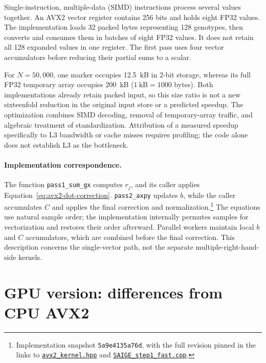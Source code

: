\documentclass{article}
\begin{document}
Single-instruction, multiple-data (SIMD) instructions process several
values together. An AVX2 vector register contains 256 bits and holds
eight FP32 values.
The implementation loads 32 packed bytes representing 128 genotypes,
then converts and consumes them in batches of eight FP32 values.
It does not retain all 128 expanded values in one register.
The first pass uses four vector accumulators before reducing their
partial sums to a scalar.

For $N=50{,}000$, one marker occupies 12.5~kB in 2-bit storage,
whereas its full FP32 temporary array occupies 200~kB
($1~\mathrm{kB}=1000$ bytes). Both implementations already retain
packed input, so this size ratio is not a new sixteenfold reduction
in the original input store or a predicted speedup.
The optimization combines SIMD decoding, removal of temporary-array
traffic, and algebraic treatment of standardization.
Attribution of a measured speedup specifically to L3 bandwidth or
cache misses requires profiling; the code alone does not establish
L3 as the bottleneck.

\paragraph{Implementation correspondence.}
The function \texttt{pass1\_sum\_gx} computes $r_j$,
and its caller applies Equation~\eqref{eq:avx2-dot-correction}.
\texttt{pass2\_axpy} updates $b$, while the caller accumulates $C$ and
applies the final correction and normalization.\footnote{Implementation
snapshot \texttt{5a9e4135a76d}, with the full revision pinned in the links to
\href{https://github.com/FrancisFengLu/SAIGE-cpp-comparison/blob/5a9e4135a76dab73d73274e930f27524c9712958/SAIGE_cpp_260716/step1_saige-null/tools/avx2_kernel/avx2_kernel.hpp}{\texttt{avx2\_kernel.hpp}}
and
\href{https://github.com/FrancisFengLu/SAIGE-cpp-comparison/blob/5a9e4135a76dab73d73274e930f27524c9712958/SAIGE_cpp_260716/step1_saige-null/SAIGE_step1_fast.cpp}{\texttt{SAIGE\_step1\_fast.cpp}}.}
The equations use natural sample order; the implementation internally
permutes samples for vectorization and restores their order afterward.
Parallel workers maintain local $b$ and $C$ accumulators, which are
combined before the final correction. This description concerns the
single-vector path, not the separate multiple-right-hand-side kernels.

\section{GPU version: differences from CPU AVX2}
\label{sec:gpu-cpu-differences}
\end{document}
